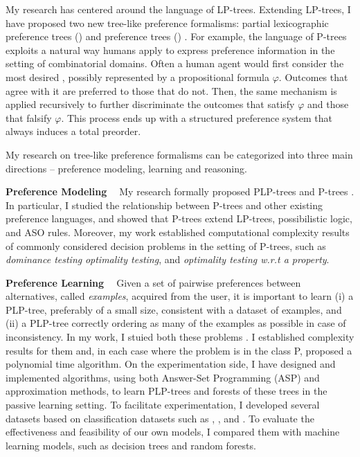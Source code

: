 My research has centered around the language of LP-trees.
Extending LP-trees, I have proposed two new tree-like preference formalisms:
partial lexicographic preference trees () \cite{conf/aaai15/LiuT}
and preference trees () \cite{fraser1994,liu2014preference,conf/adt15/liuT}.
For example, the language of P-trees exploits a natural way humans apply to
express preference information in the setting of combinatorial domains.
Often a human agent would first consider the most desired ,
possibly represented by a propositional formula $\varphi$.
Outcomes that agree with it are preferred to those that do not.  
Then, the same mechanism is applied recursively to further discriminate the 
outcomes that satisfy $\varphi$ and those that falsify $\varphi$.
This process ends up with a structured preference system that always
induces a total preorder.

My research on tree-like preference formalisms can be categorized into
three main directions -- preference modeling, learning and reasoning.

\smallskip \noindent \textbf{Preference Modeling \ }
\noindent My research formally proposed 
PLP-trees \cite{conf/aaai15/LiuT} and P-trees \cite{liu2014preference,conf/adt15/liuT}.
In particular, I studied
the relationship between P-trees and other existing preference languages, and
showed that P-trees extend
LP-trees, possibilistic logic, and ASO rules.
Moreover, my work established computational complexity results of commonly considered decision
problems in the setting of P-trees, such as \textit{dominance testing} 
\textit{optimality testing}, and
\textit{optimality testing w.r.t a property}.

\smallskip \noindent \textbf{Preference Learning \ }
Given a set of pairwise preferences between alternatives, 
called \textit{examples}, acquired from the user,
it is important to learn (i) a PLP-tree, 
preferably of a small size, 
consistent with a dataset of examples, and (ii) a PLP-tree correctly
ordering as many of the examples as possible in case
of inconsistency. In my work, I stuied both these problems \cite{conf/aaai15/LiuT}. 
I established complexity results
for them and, in each case where the problem
is in the class P, proposed a polynomial time algorithm.
On the experimentation side,
I have designed and implemented algorithms, using both
Answer-Set Programming (ASP) and approximation methods, to learn PLP-trees 
and forests of these trees in the passive learning setting.
To facilitate experimentation, I developed several datasets
based on classification datasets such as ,
, and .
To evaluate the effectiveness and feasibility of our own models, I 
compared them with machine learning models, such as 
decision trees and random forests.

